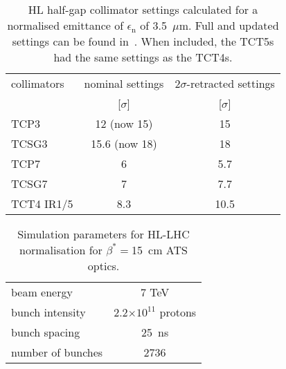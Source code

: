  \begin{table}[hbt]
   \centering
   \caption{HL half-gap collimator settings calculated for a normalised emittance of $\epsilon_{\mathrm{n}}$ of 3.5~$\mu$m. Full and updated settings can be found in~\cite{collSettRef}. When included, the TCT5s had the same settings as the TCT4s.}

   \begin{tabular}{l|c|c}
       \hline
       collimators &        nominal settings & $2\sigma$-retracted settings\\
                   &         [$\sigma$] &  [$\sigma$]\\
       \hline
       TCP3 & 12 (now 15) & 15 \\
       TCSG3 & 15.6 (now 18)& 18 \\
       TCP7 & 6 & 5.7 \\
       TCSG7 & 7 & 7.7 \\
       TCT4 IR1/5 & 8.3 & 10.5 \\
       \hline
   \end{tabular}
   \label{HLcollSettings}
\end{table}

\begin{table}[!hbt]
   \centering
   \caption{Simulation parameters for HL-LHC normalisation for $\beta^* =$15~cm ATS optics.}
   \begin{tabular}{l|c}
       \hline
       beam energy & 7 TeV \\
       bunch intensity & 2.2$\times 10^{11}$ protons\\
       bunch spacing & 25~ns \\
       number of bunches & 2736 \\
       \hline
   \end{tabular}
   \label{hlscenario}
\end{table}
